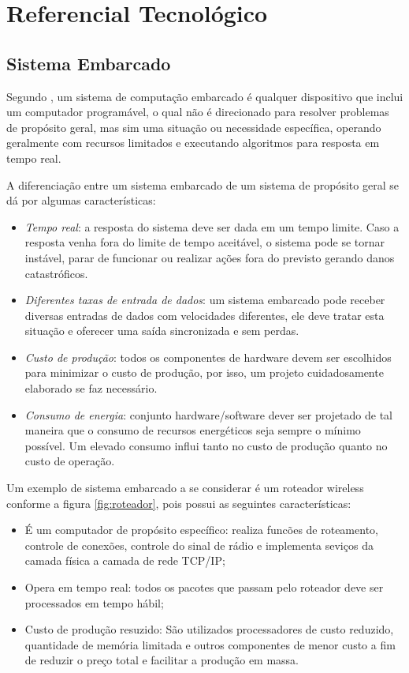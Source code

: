 ﻿\chapter{Referencial Tecnol\'{o}gico}
\label{cap:referencial tecnologico}


\section{Sistema Embarcado}

Segundo \textcite{Wolf:2001}, um sistema de computação embarcado é qualquer dispositivo que inclui um computador programável, o qual não é direcionado para resolver problemas de propósito geral, mas sim uma situação ou necessidade específica, operando geralmente com recursos limitados e executando algoritmos para resposta em tempo real.

A diferenciação entre um sistema embarcado de um sistema de propósito geral se dá por algumas características:
\begin{itemize}
	\item \emph{Tempo real}: a resposta do sistema deve ser dada em um tempo limite. Caso a resposta venha fora do limite de tempo aceitável, o sistema pode se tornar instável, parar de funcionar ou realizar ações fora do previsto gerando danos catastróficos. 
	\item \emph{Diferentes taxas de entrada de dados}: um sistema embarcado pode receber diversas entradas de dados com velocidades diferentes, ele deve tratar esta situação e oferecer uma saída sincronizada e sem perdas.
	\item \emph{Custo de produção}: todos os componentes de hardware devem ser escolhidos para minimizar o custo de produção, por isso, um projeto cuidadosamente elaborado se faz necessário.
	\item \emph{Consumo de energia}: conjunto hardware/software dever ser projetado de tal maneira que o consumo de recursos energéticos seja sempre o mínimo possível. Um elevado consumo influi tanto no custo de produção  quanto no custo de operação.
\end{itemize}

Um exemplo de sistema embarcado a se considerar é um roteador wireless conforme a figura \ref{fig:roteador}, pois possui as seguintes características:

\begin{itemize}
	\item É um computador de propósito específico: realiza funcões de roteamento, controle de conexões, controle do sinal de rádio e implementa seviços da camada física a camada de rede TCP/IP;
	\item Opera em tempo real: todos os pacotes que passam pelo roteador deve ser processados em tempo hábil;
	\item Custo de produção resuzido: São utilizados processadores de custo reduzido, quantidade de memória limitada e outros componentes de menor custo a fim de reduzir o preço total e facilitar a produção em massa.
\end{itemize}

